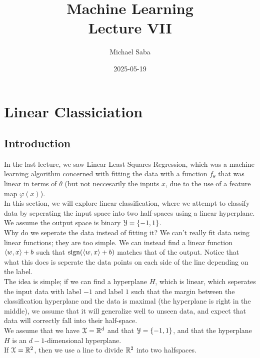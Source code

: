 \documentclass[12pt]{article}
\title{%
    \Huge Machine Learning \\
    \Large Lecture VII
}
\date{2025-05-19}
\author{Michael Saba}
\begin{document}
\maketitle
\newpage
\setlength{\parindent}{0pt}

\section*{Linear Classiciation}

\subsection*{Introduction}

In the last lecture, we saw Linear Least Squares
Regression,
which was a machine learning algorithm concerned
with fitting the data with a function $f_\theta$
that was linear in terms of $\theta$
(but not neccesarily the inputs $x$,
due to the use of a feature map $\varphi(x)$). \\

In this section, we will explore
linear classification, where we attempt
to classify data by seperating the input space
into two half-spaces using a linear 
hyperplane. \\

We assume the output space is binary
$\mathcal{Y} = \{-1, 1\}$. \\

Why do we seperate the data instead of fitting it?
We can't really fit data using linear functions;
they are too simple. We can instead
find a linear function $\left\langle w, x \right\rangle + b$
such that $\text{sign}(\left\langle w, x \right\rangle + b)$
matches that of the output.
Notice that what this does is seperate
the data points on each side of the line
depending on the label. \\

The idea is simple; if we can find a hyperplane
$H$, which is linear, which seperates the input
data with label $-1$ and label $1$
such that the margin between the classification
hyperplane and the data is maximal
(the hyperplane is right in the middle),
we assume that it will generalize well
to unseen data, and expect that data will
correctly fall into their half-space. \\

We assume that we have $\mathcal{X} = \mathbb{R}^d$ and that
$\mathcal{Y} = \{-1, 1\}$,
and that the hyperplane $H$
is an $d-1$-dimensional hyperplane. \\
If $\mathcal{X} = \mathbb{R}^2$, then we use a
line to divide $\mathbb{R}^2$ into two halfspaces. \\
\end{document}
